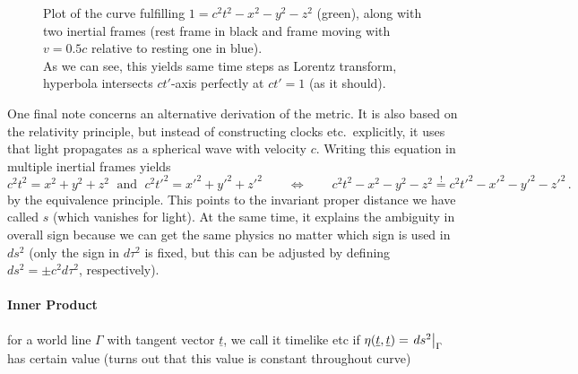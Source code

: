\begin{figure}
	\centering


	\caption{Plot of the curve fulfilling $1 = c^2 t^2 - x^2 - y^2 - z^2$ (green), along with two inertial frames (rest frame in black and frame moving with $v = 0.5 c$ relative to resting one in blue).\\
	As we can see, this yields same time steps as Lorentz transform, hyperbola intersects $ct'$-axis perfectly at $c t' = 1$ (as it should).}
	\label{fig:minkowski_with_eichhyperbel}
\end{figure}


One final note concerns an alternative derivation of the metric. It is also based on the relativity principle, but instead of constructing clocks etc.~explicitly, it uses that light propagates as a spherical wave with velocity $c$. Writing this equation in multiple inertial frames yields
\begin{equation}
c^2 t^2 = x^2 + y^2 + z^2 \; \text{ and } \; c^2 t'^2 = x'^2 + y'^2 + z'^2 \qquad \Leftrightarrow \qquad c^2 t^2 - x^2 - y^2 - z^2 \overset{!}{=} c^2 t'^2 - x'^2 - y'^2 - z'^2 \, .
\end{equation}
by the equivalence principle. This points to the invariant proper distance we have called $s$ (which vanishes for light). At the same time, it explains the ambiguity in overall sign because we can get the same physics no matter which sign is used in $ds^2$ (only the sign in $d\tau^2$ is fixed, but this can be adjusted by defining $ds^2 = \pm c^2 d\tau^2$, respectively).



		\paragraph{Inner Product}

for a world line $\Gamma$ with tangent vector $\underline{t}$, we call it timelike etc if $\eta(\underline{t}, \underline{t}) = \eval{ds^2}_\Gamma$ has certain value (turns out that this value is constant throughout curve)


